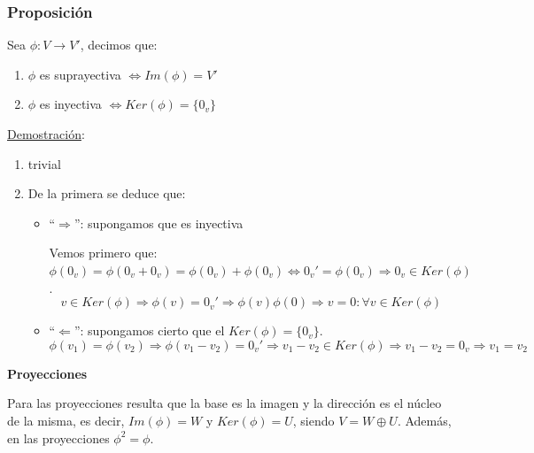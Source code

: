 \documentclass[10pt,a4paper,openright]{book}
\begin{document}
\subsubsection*{Proposición}
Sea $\phi: V\longrightarrow V'$, decimos que:
\begin{enumerate}
\item $\phi$ es suprayectiva $\Leftrightarrow Im(\phi)=V'$
\item $\phi$ es inyectiva $\Leftrightarrow Ker(\phi)=\{0_v\}$
\end{enumerate}

\underline{Demostración}:
\begin{enumerate}
\item trivial

\item De la primera se deduce que:
\begin{itemize}
\item ``$\Rightarrow$'': supongamos que es inyectiva\par
Vemos primero que: $\phi(0_v)=\phi(0_v+0_v)=\phi(0_v)+\phi(0_v)\Leftrightarrow 0_v'=\phi(0_v)\Rightarrow 0_v\in Ker(\phi)$.
$$v\in Ker(\phi)\Rightarrow \phi(v)=0_v'\Rightarrow \phi(v)\phi(0)\Rightarrow v=0:\forall v\in Ker(\phi)$$

\item ``$\Leftarrow$'': supongamos cierto que el $Ker(\phi)=\{0_v\}$.
$$\phi(v_1)=\phi(v_2)\Rightarrow \phi(v_1-v_2)=0_v'\Rightarrow v_1-v_2\in Ker(\phi)\Rightarrow v_1-v_2=0_v\Rightarrow v_1=v_2$$
\end{itemize}
\end{enumerate}

\textbf{Proyecciones}\par

Para las proyecciones resulta que la base es la imagen y la dirección es el núcleo de la misma, es decir, $Im(\phi)=W$ y $Ker(\phi)=U$, siendo $V=W\oplus U$. Además, en las proyecciones $\phi^2=\phi$.\par
\end{document}
